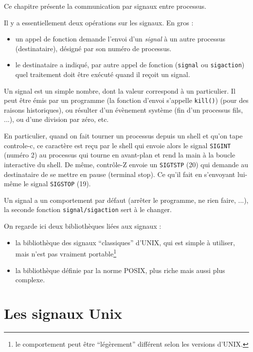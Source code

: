 Ce chapitre présente la communication par signaux entre processus.

Il y a essentiellement deux opérations sur les signaux. En gros :

\begin{itemize}
\item un appel de fonction demande l'envoi d'un \emph{signal} à un
  autre processus (destinataire), désigné par son numéro de processus.
\item le destinataire a indiqué, par autre appel de fonction
  (\texttt{signal} ou \texttt{sigaction}) quel traitement
  doit être exécuté quand il reçoit un
  signal.
\end{itemize}

Un signal est un simple nombre, dont la valeur correspond à un
particulier. Il peut être émis par un programme (la fonction d'envoi
s'appelle \texttt{kill()}) (pour des raisons historiques), ou résulter
d'un évènement système (fin d'un processus fils, ...), ou d'une
division par zéro, etc.

En particulier, quand on fait tourner un processus depuis un shell et
qu'on tape controle-c, ce caractère est reçu par le shell qui envoie
alors le signal \texttt{SIGINT} (numéro 2) au processus qui tourne en
avant-plan et rend la main à la boucle interactive du shell. De même,
contrôle-Z envoie un \texttt{SIGTSTP} (20) qui demande au destinataire
de se mettre en pause (terminal stop). Ce qu'il fait en s'envoyant
lui-même le signal \texttt{SIGSTOP} (19).


Un signal a un comportement par défaut (arrêter le
programme, ne rien faire, ...), la seconde fonction
\texttt{signal/sigaction} sert à le changer.

On regarde ici deux bibliothèques liées aux signaux :

\begin{itemize}
\item la bibliothèque des signaux ``classiques'' d'UNIX, qui est
  simple à utiliser, mais n'est pas vraiment portable\footnote{le
    comportement peut être ``légèrement'' différent selon les versions
    d'UNIX.}
\item la bibliothèque définie par la norme POSIX, plus riche mais aussi
  plus complexe.
\end{itemize}

\section{Les signaux Unix}

